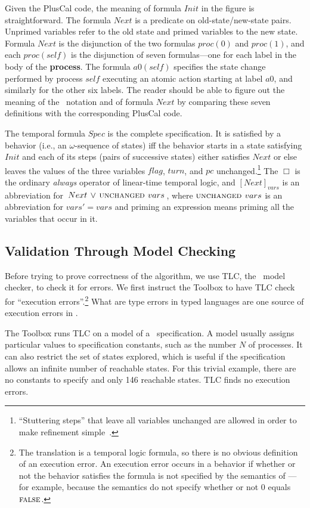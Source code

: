 \documentclass[a4paper,draft]{llncs}
\renewcommand{\FALSE}{\textsc{false}}
\renewcommand{\UNCHANGED}{\textsc{unchanged }}
\begin{document}
Given the PlusCal code, the meaning of formula $Init$ in the figure is
straightforward.  The formula $Next$ is a predicate on
old-state/new-state pairs.  Unprimed variables refer to the old state
and primed variables to the new state.  Formula $Next$ is the
disjunction of the two formulas $proc(0)$ and $proc(1)$, and each
$proc(self)$ is the disjunction of seven formulas---one for each label
in the body of the \textbf{process}.  The formula $a0(self)$ specifies
the state change performed by process $self$ executing an atomic
action starting at label $a0$, and similarly for the other six labels.
The reader should be able to figure out the meaning of the \tlaplus\ 
notation and of formula $Next$ by comparing these seven definitions
with the corresponding PlusCal code.

The temporal formula $Spec$ is the complete specification.  It is
satisfied by a behavior (i.e., an $\omega$-sequence of states) 
iff the behavior starts in a state satisfying
$Init$ and each of its steps (pairs of successive states) either
satisfies $Next$ or else leaves the values of the three variables
$flag$, $turn$, and $pc$ unchanged.\footnote{``Stuttering steps'' that
  leave all variables unchanged are allowed in order to make refinement
  simple~\cite{lamport:what-good}.} The $\Box$ is the ordinary
\emph{always} operator of linear-time temporal logic, and
$[Next]_{vars}$ is an abbreviation for \,\mbox{$Next \,\lor\,
\UNCHANGED vars$}\,, where $\UNCHANGED vars$ is an abbreviation for
$vars'=vars$ and priming an expression means priming all the variables
that occur in it.


\subsection{Validation Through Model Checking}
\label{sec:model-checking}

Before trying to prove correctness of the algorithm, we use TLC,
the \tlaplus\ model checker, to check it for errors.
We first instruct the Toolbox to have TLC check for
``execution errors''.\footnote{The translation is a
  temporal logic formula, so there is no obvious definition of an
   execution error.  An execution error occurs in a
  behavior if whether or not the behavior satisfies the formula is not
  specified by the semantics of \tlaplus---for example, because
  the semantics do not specify whether or not 0 equals $\FALSE$.}
What are type errors in typed languages are one source of execution
errors in \tlaplus.

The Toolbox runs TLC on a model of a \tlaplus\ specification.  A model
usually assigns particular values to specification constants, such as
the number $N$ of processes. It can also restrict the set of states
explored, which is useful if the specification allows an infinite number
of reachable states.  For this trivial example, there are no constants
to specify and only 146 reachable states.  TLC finds no execution
errors.
\end{document}
